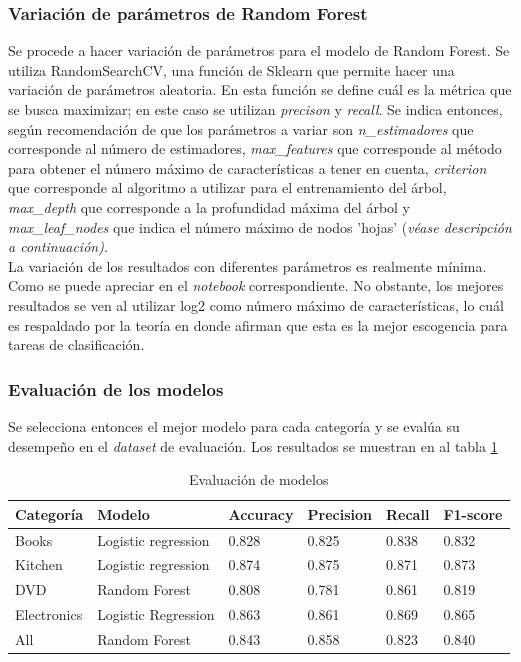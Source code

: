 \subsubsection{Variación de parámetros de Random Forest}
Se procede a hacer variación de parámetros para el modelo de Random Forest. Se utiliza RandomSearchCV, una función de Sklearn que permite hacer una variación de parámetros aleatoria. En esta función se define cuál es la métrica que se busca maximizar; en este caso se utilizan \textit{precison} y \textit{recall}. Se indica entonces, según recomendación de \cite{Sklearn-RF} que los parámetros a variar son \textit{n\_estimadores} que corresponde al número de estimadores, \textit{max\_features} que corresponde al método para obtener el número máximo de características a tener en cuenta, \textit{criterion} que corresponde al algoritmo a utilizar para el entrenamiento del árbol, \textit{max\_depth} que corresponde a la profundidad máxima del árbol y \textit{max\_leaf\_nodes} que indica el número máximo de nodos 'hojas' (\textit{véase descripción a continuación)}.\\

La variación de los resultados con diferentes parámetros es realmente mínima. Como se puede apreciar en el \textit{notebook} correspondiente. No obstante, los mejores resultados se ven al utilizar log2 como número máximo de características, lo cuál es respaldado por la teoría\cite{Sklearn-RF} en donde afirman que esta es la mejor escogencia para tareas de clasificación.

\subsubsection{Evaluación de los modelos}
Se selecciona entonces el mejor modelo para cada categoría y se evalúa su desempeño en el \textit{dataset} de evaluación. Los resultados se muestran en al tabla \ref{tab:model_eval}
\begin{table}[]
\centering
\caption{Evaluación de modelos}
\label{tab:model_eval}
\begin{tabular}{|l|l|l|l|l|l|}
\hline
\textbf{Categoría} & \textbf{Modelo}     & \textbf{Accuracy} & \textbf{Precision} & \textbf{Recall} & \textbf{F1-score} \\ \hline
Books              & Logistic regression & 0.828             & 0.825              & 0.838           & 0.832             \\ \hline
Kitchen            & Logistic regression & 0.874             & 0.875              & 0.871           & 0.873             \\ \hline
DVD                & Random Forest       & 0.808             & 0.781              & 0.861           & 0.819             \\ \hline
Electronics        & Logistic Regression & 0.863             & 0.861              & 0.869           & 0.865             \\ \hline
All                & Random Forest       & 0.843             & 0.858              & 0.823           & 0.840             \\ \hline
\end{tabular}
\end{table}

